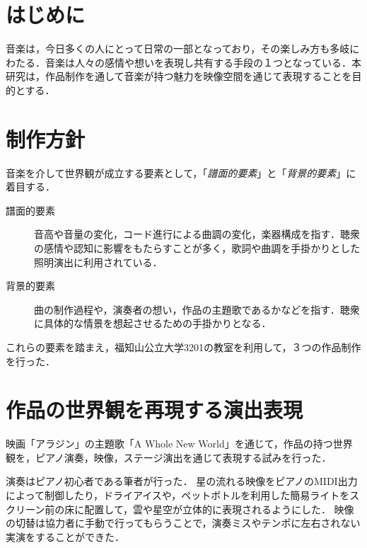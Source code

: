 

\section{はじめに}
音楽は，今日多くの人にとって日常の一部となっており，その楽しみ方も多岐にわたる．音楽は人々の感情や想いを表現し共有する手段の１つとなっている．本研究は，作品制作を通して音楽が持つ魅力を映像空間を通じて表現することを目的とする．

\sectionmargin
\section{制作方針}
音楽を介して世界観が成立する要素として，「\emph{譜面的要素}」と「\emph{背景的要素}」に着目する．

\begin{description}
    \item[譜面的要素] 音高や音量の変化，コード進行による曲調の変化，楽器構成を指す．聴衆の感情や認知に影響をもたらすことが多く，歌詞や曲調を手掛かりとした照明演出に利用されている\cite{Kanno22}．
    \item[背景的要素] 曲の制作過程や，演奏者の想い，作品の主題歌であるかなどを指す．聴衆に具体的な情景を想起させるための手掛かりとなる．
\end{description}
%
これらの要素を踏まえ，福知山公立大学3201の教室を利用して，３つの作品制作を行った．

\sectionmargin
\section{作品の世界観を再現する演出表現}
映画「アラジン」の主題歌「A Whole New World」\cite{Aladdin}を通じて，作品の持つ世界観を，ピアノ演奏，映像，ステージ演出を通じて表現する試みを行った．

演奏はピアノ初心者である筆者が行った．
星の流れる映像をピアノのMIDI出力によって制御したり，ドライアイスや，ペットボトルを利用した簡易ライトをスクリーン前の床に配置して，雲や星空が立体的に表現されるようにした．
映像の切替は協力者に手動で行ってもらうことで，演奏ミスやテンポに左右されない実演をすることができた．


